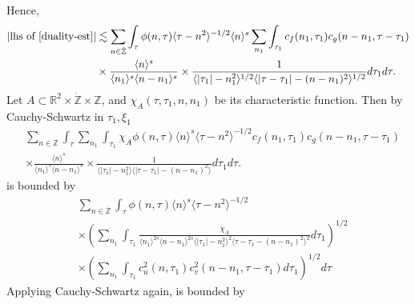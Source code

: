 \documentclass[12pt,reqno]{amsart}
\numberwithin{equation}{section}  %
\renewcommand{\cref}{\Cref}
\newcommand{\rr}{\mathbb{R}}
\newcommand{\zz}{\mathbb{Z}}
\newcommand{\zzdot}{\dot{\zz}}
\begin{document}
Hence, 
\begin{equation}
\label{pre-fubini-int-form}
\begin{split}
|\text{lhs of} \ \cref{duality-est}|
& \lesssim \sum_{n \in \zzdot} \int_{\tau} \phi(n, \tau)\langle \tau - n^{2} \rangle^{-1/2}  \langle n \rangle^s 
\sum_{n_{1}}
\int_{\tau_{1}} c_f(n_1, \tau_1)
c_g(n - n_1, \tau - \tau_1 )
\\
& \times \frac{\langle n \rangle ^{s}}{\langle n_{1} \rangle ^{s} \langle
n-n_{1} \rangle ^{s}} \times \frac{1}{\langle |\tau_{1}|-n_{1}^{2} \rangle^{1/2}\langle | \tau -
\tau_{1}|-(n - n_{1})^{2}
\rangle^{1/2}} d \tau_1 d \tau.
\end{split}
\end{equation}
Let $A \subset \rr^{2} \times \zzdot \times \zz$, and $\chi_{A}(\tau, \tau_{1}, n, n_{1})$
be its
characteristic function. Then by Cauchy-Schwartz in
$\tau_{1}, \xi_{1}$
\begin{equation*}
\begin{split}
& \sum_{n \in \zzdot} \int_{\tau}   \sum_{n_{1}}
\int_{\tau_{1}} \chi_{A}
\phi(n, \tau) \langle n \rangle^s \langle \tau - n^{2} \rangle^{-1/2}
c_f(n_1, \tau_1)
c_g(n - n_1, \tau - \tau_1 )
\\
& \times \frac{\langle n \rangle ^{s}}{\langle n_{1} \rangle ^{s} \langle
n-n_{1} \rangle ^{s}} \times \frac{1}{\langle |\tau_{1}|-n_{1}^{2} \rangle\langle | \tau -
\tau_{1}|-(n - n_{1})^{2}
\rangle} d \tau_1 d \tau.
\end{split}
\end{equation*}
is bounded by 
\begin{equation}
\label{10g}
\begin{split}
& \sum_{n \in \zzdot} \int_{\tau} \phi(n, \tau) \langle n \rangle ^{s}
\langle \tau - n^{2} \rangle ^{-1/2}
\\
& \times \left( \sum_{n_{1}} \int_{\tau_{1}}
\frac{\chi_{A}}{\langle n_{1} \rangle ^{2s} \langle n-n_{1} \rangle ^{2s} \langle |
\tau_{1} | - n_{1}^{2}\rangle^{2}  \langle \tau - \tau_{1} -
(n - n_{1})^{2} \rangle^{2}} d \tau_{1} \right)^{1/2}
\\
& \times \left( \sum_{n_{1}} \int_{\tau_{1}} c_{u}^{2}(n, \tau_{1})
c_{v}^{2}(n - n_{1}, \tau - \tau_{1}) d \tau_{1} \right)^{1/2} d \tau
\end{split}
\end{equation}
Applying Cauchy-Schwartz again, \cref{10g} is bounded by
\end{document}
